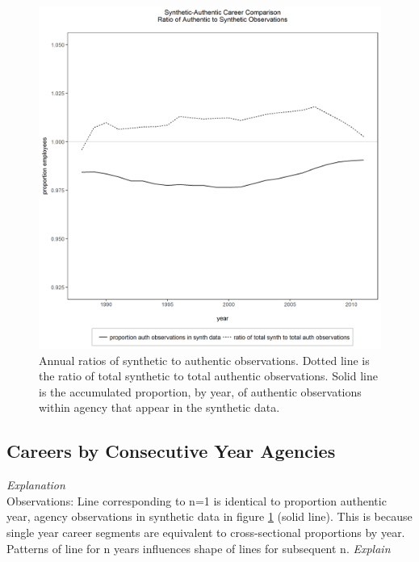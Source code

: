 \documentclass[10pt, letterpaper]{article}
\begin{document}
\begin{spacing}{1.0}
\begin{figure}[h]
    \centering
    \includegraphics[width=5.25in, trim={0 0.85in 0 0.5in}, clip]{TotalObsProportions.png}
    \caption{Annual ratios of synthetic to authentic observations.  Dotted line is the ratio of total synthetic to total authentic observations.  Solid line is the accumulated proportion, by year, of authentic observations within agency that appear in the synthetic data.}
    \label{figure:TotalObsProportions}
\end{figure}

\clearpage

\subsection{Careers by Consecutive Year Agencies}

\textit{Explanation}\\

Observations:  Line corresponding to n=1 is identical to proportion authentic year, agency observations in synthetic data in figure \ref{figure:TotalObsProportions} (solid line).  This is because single year career segments are equivalent to cross-sectional proportions by year.\\

Patterns of line for n years influences shape of lines for subsequent n.  \textit{Explain}\\


\end{spacing}
\end{document}

